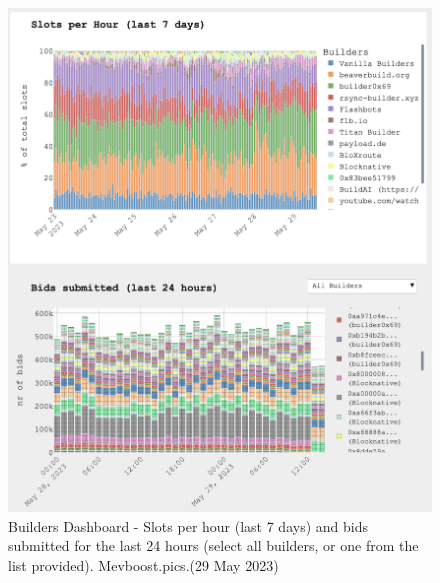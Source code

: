 \documentclass[UTF8]{article}
\begin{document}
\begin{figure}[htbp]
\begin{center}
\includegraphics[width=0.9\linewidth]{images/mevbuilder2}
\caption{Builders Dashboard - Slots per hour (last 7 days) and bids submitted  for the last 24 hours (select all builders, or one from the list provided). Mevboost.pics.(29 May 2023)}
\label{fig:mevbuilder2}
\end{center}
\end{figure}
\end{document}
